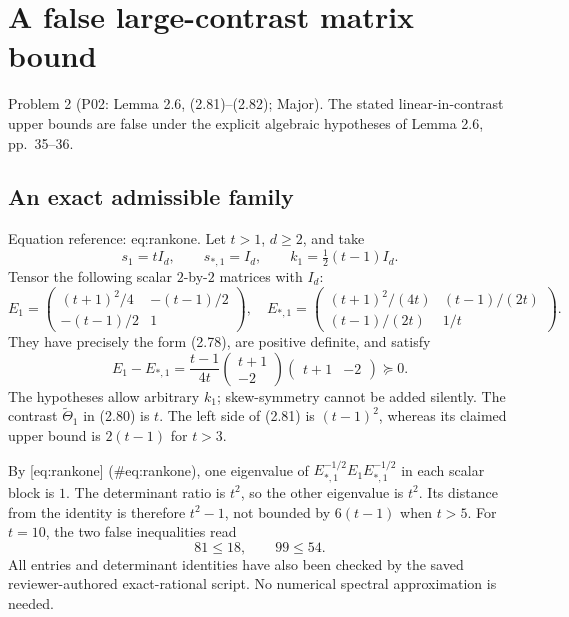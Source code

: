 \documentclass[10pt]{article}
\begin{document}
\section*{A false large-contrast matrix bound}
Problem 2 (P02: Lemma 2.6, (2.81)–(2.82); Major).  The stated linear-in-contrast upper bounds are false under the explicit algebraic hypotheses of Lemma 2.6, pp. 35–36.\par
\subsection*{An exact admissible family}
Equation reference: eq:rankone. Let \(t>1\), \(d\ge2\), and take \[s_1=tI_d,\qquad s_{*,1}=I_d,\qquad k_1=\tfrac12(t-1)I_d.\] Tensor the following scalar \(2\)-by-\(2\) matrices with \(I_d\): \[E_1=\begin{pmatrix}(t+1)^2/4&-(t-1)/2\\-(t-1)/2&1\end{pmatrix},
 \quad
 E_{*,1}=\begin{pmatrix}(t+1)^2/(4t)&(t-1)/(2t)\\
                         (t-1)/(2t)&1/t\end{pmatrix}.\] They have precisely the form (2.78), are positive definite, and satisfy \[
 E_1-E_{*,1}
 =\frac{t-1}{4t}
   \begin{pmatrix}t+1\\-2\end{pmatrix}
   \begin{pmatrix}t+1&-2\end{pmatrix}\succeq0.\] The hypotheses allow arbitrary \(k_1\); skew-symmetry cannot be added silently. The contrast \(\widetilde\Theta_1\) in (2.80) is \(t\). The left side of (2.81) is \((t-1)^2\), whereas its claimed upper bound is \(2(t-1)\) for \(t>3\).\par
By [eq:rankone] (\#eq:rankone), one eigenvalue of \(E_{*,1}^{-1/2}E_1E_{*,1}^{-1/2}\) in each scalar block is \(1\). The determinant ratio is \(t^2\), so the other eigenvalue is \(t^2\). Its distance from the identity is therefore \(t^2-1\), not bounded by \(6(t-1)\) when \(t>5\). For \(t=10\), the two false inequalities read \[81\le18,\qquad 99\le54.\] All entries and determinant identities have also been checked by the saved reviewer-authored exact-rational script. No numerical spectral approximation is needed.\par
\end{document}
